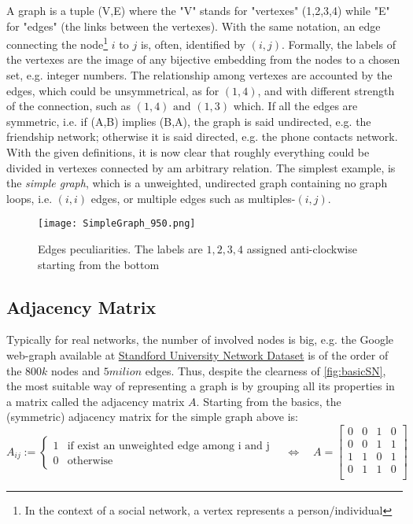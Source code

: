 \documentclass[a4paper,12pt,twoside]{book} %
\theoremstyle{definition}
\begin{document}
A graph is a tuple (V,E) where the "V" stands for "vertexes" (1,2,3,4) while "E" for "edges" (the links between the vertexes).
With the same notation, an edge connecting the node\footnote{In the context of a social network, a vertex represents a person/individual} $i$ to $j$ is, often, identified by $(i,j)$.
Formally, the labels of the vertexes are the image of any bijective embedding from the nodes to a chosen set, e.g. integer numbers. The relationship among vertexes are accounted by the edges, which could be unsymmetrical, as for $(1,4)$, and with different strength of the connection, such as $(1,4) \text{ and } (1,3)$ which. If all the edges are symmetric, i.e. if (A,B) implies (B,A), the graph is said undirected, e.g. the friendship network; otherwise it is said directed, e.g. the phone contacts network. 
With the given definitions, it is now clear that roughly everything could be divided in vertexes connected by am arbitrary relation.
The simplest example, is the \textit{simple graph}, which is a unweighted, undirected graph containing no graph loops, i.e. $(i,i)$ edges, or multiple edges such as multiples-$(i,j)$.
\begin{figure}[ht]
	\texttt{[image: SimpleGraph\_950.png]}
	\caption{Edges peculiarities. The labels are $1,2,3,4$ assigned anti-clockwise starting from the bottom}
	\label{fig:simple}
\end{figure}
\newpage

\subsection{Adjacency Matrix}
Typically for real networks, the number of involved nodes is big, e.g. the Google web-graph available at \href{https://snap.stanford.edu/data/#socnets}{Standford University Network Dataset} is of the order of the $800k$ nodes and $5milion$ edges. Thus, despite the clearness of \autoref{fig:basicSN}, the most suitable way of representing a graph is by grouping all its properties in a matrix called the adjacency matrix $A$. 
Starting from the basics, the (symmetric) adjacency matrix for the simple graph above is:
\[
A_{ij} :=
\begin{cases}
1 & \text{if exist an unweighted edge among i and j} \\
0 & \text{otherwise}
\end{cases}
\quad
\Leftrightarrow
\quad
A = 
\begin{bmatrix}
0 & 0 & 1 & 0 \\
0 & 0 & 1 & 1 \\
1 & 1 & 0 & 1 \\
0 & 1 & 1 & 0 \\
\end{bmatrix}
\]
\end{document}
